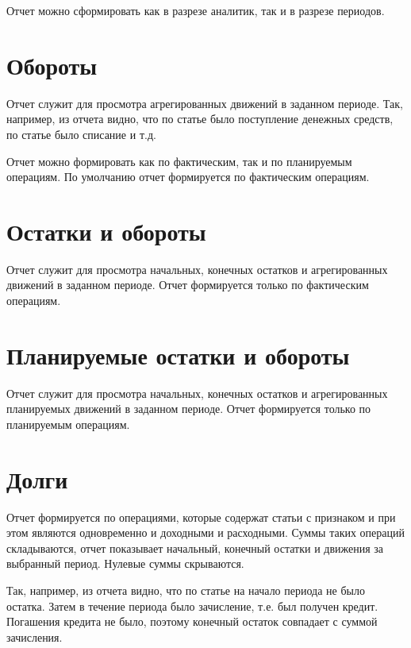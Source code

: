 \documentclass[a4paper,10pt,russian]{sphinxmanual}
\begin{document}
Отчет можно сформировать как в разрезе аналитик, так и в разрезе периодов.


\section{Обороты}
\label{\detokenize{reports:id4}}
Отчет служит для просмотра агрегированных движений в заданном периоде. Так, например,
из отчета видно, что по статье  было поступление денежных средств, по статье 
было списание и т.д.

Отчет можно формировать как по фактическим, так и по планируемым операциям. По умолчанию отчет формируется
по фактическим операциям.


\section{Остатки и обороты}
\label{\detokenize{reports:id5}}
Отчет служит для просмотра начальных, конечных остатков и агрегированных движений в заданном периоде. Отчет формируется
только по фактическим операциям.

\noindent{}
\noindent{}
\noindent{}


\section{Планируемые остатки и обороты}
\label{\detokenize{reports:id6}}
Отчет служит для просмотра начальных, конечных остатков и агрегированных планируемых движений в заданном периоде. Отчет формируется
только по планируемым операциям.


\section{Долги}
\label{\detokenize{reports:id7}}
Отчет формируется по операциями, которые содержат статьи с признаком  и при этом являются
одновременно и доходными и расходными. Суммы таких операций складываются, отчет показывает начальный, конечный
остатки и движения за выбранный период. Нулевые суммы скрываются.

Так, например, из отчета видно, что по статье  на начало периода не было остатка. Затем
в течение периода было зачисление, т.е. был получен кредит. Погашения кредита не было, поэтому конечный
остаток совпадает с суммой зачисления.
\end{document}
